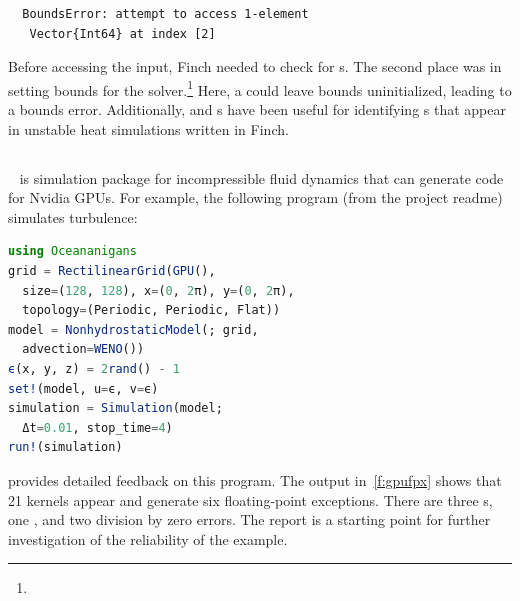 \documentclass{juliacon}
\begin{document}
\begin{lstlisting}
  BoundsError: attempt to access 1-element
   Vector{Int64} at index [2]
\end{lstlisting}

Before accessing the input, Finch needed to check for \NaN{}s.
The second place was in setting bounds for the
solver.\footnote{}
Here, a \NaN{} could leave bounds uninitialized, leading to a bounds error.
Additionally, \TF{} and \CSTG{}s have been useful for identifying \NaN{}s that
appear in unstable heat simulations written in Finch.

\subsection{\Oceananigans{}}
\label{s:ocean}

\Oceananigans{}~\cite{OceananigansJOSS} is simulation package for incompressible
fluid dynamics that can generate code for Nvidia GPUs.
For example, the following program (from the project readme) simulates turbulence:

\begin{lstlisting}[language = Julia]
using Oceananigans
grid = RectilinearGrid(GPU(),
  size=(128, 128), x=(0, 2π), y=(0, 2π),
  topology=(Periodic, Periodic, Flat))
model = NonhydrostaticModel(; grid,
  advection=WENO())
ϵ(x, y, z) = 2rand() - 1
set!(model, u=ϵ, v=ϵ)
simulation = Simulation(model;
  Δt=0.01, stop_time=4)
run!(simulation)
\end{lstlisting}

\GPUFPX{} provides detailed feedback on this program.
The output in~\cref{f:gpufpx} shows that 21 kernels
appear and generate six floating-point exceptions.
There are three \NaN{}s, one \Inf{}, and two division
by zero errors.
The report is a starting point for further investigation
of the reliability of the example.
\end{document}
